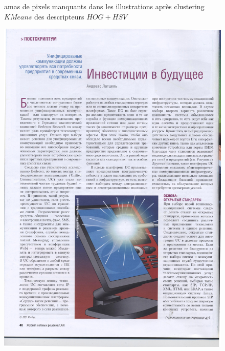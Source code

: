 \documentclass{book}
\begin{document}
\begin{figure}[H]
\begin{center}
\end{center}
\caption{amas de pixels manquants dans les illustrations après clustering $KMeans$ des descripteurs $HOG+HSV$}
\label{rect1}
\end{figure}

\begin{figure}[H]
\begin{center}
\includegraphics[scale=0.25]{images/rect_50.jpg}

\end{center}
\end{figure}
\end{document}
